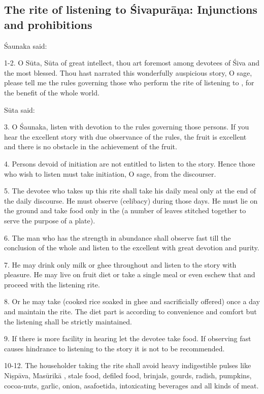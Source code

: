 {}
\subsection*{The rite of listening to Śivapurāṇa: Injunctions and prohibitions}

Śaunaka said:

1-2. O Sūta, Sūta of great intellect, thou art foremost among devotees of Śiva
and the most blessed. Thou hast narrated this wonderfully auspicious story, O
sage, please tell me the rules governing those who perform the rite of listening
to , for the benefit of the whole world.

Sūta said:

3. O Śaunaka, listen with devotion to the rules governing those persons. If you
hear the excellent story with due observance of the rules, the fruit is
excellent and there is no obstacle in the achievement of the fruit.

4. Persons devoid of initiation are not entitled to listen to the story. Hence
those who wish to listen must take initiation, O sage, from the discourser.

5. The devotee who takes up this rite shall take his daily meal only at the end
of the daily discourse. He must observe  (celibacy) during those
days. He must lie on the ground and take food only in the  (a
number of leaves stitched together to serve the purpose of a plate).

6. The man who has the strength in abundance shall observe fast till the
conclusion of the whole  and listen to the excellent 
with great devotion and purity.

7. He may drink only milk or ghee throughout and listen to the story with
pleasure. He may live on fruit diet or take a single meal or even eschew that
and proceed with the listening rite.

8. Or he may take  (cooked rice soaked in ghee and sacrificially
offered) once a day and maintain the rite. The diet part is according to
convenience and comfort but the listening shall be strictly maintained.

9. If there is more facility in hearing let the devotee take food. If observing
fast causes hindrance to listening to the story it is not to be recommended.

10-12. The householder taking the rite shall avoid heavy indigestible pulses
like Niṣpāva, Masūrikā \etc, stale food, defiled food, brinjals, gourds, radish,
pumpkins, cocoa-nuts, garlic, onion, asafoetida, intoxicating beverages and all
kinds of meat.

